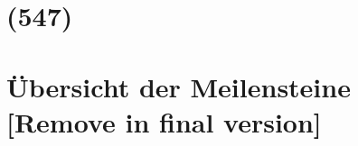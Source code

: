 \begin{comment}
------------------------------------------------------------------------------------------
\end{comment}
\section{(547)}



\begin{comment}
------------------------------------------------------------------------------------------
\end{comment}
\section{Übersicht der Meilensteine [Remove in final version]}

